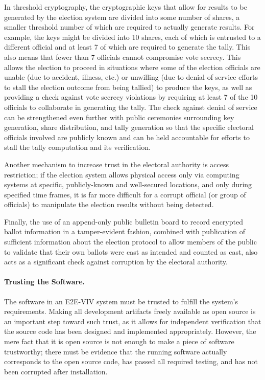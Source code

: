 In threshold cryptography, the cryptographic keys that allow for
results to be generated by the election system are divided into some
number of shares, a smaller threshold number of which are required to
actually generate results. For example, the keys might be divided into
10 shares, each of which is entrusted to a different official and at
least 7 of which are required to generate the tally. This also means
that fewer than 7 officials cannot compromise vote secrecy. This
allows the election to proceed in situations where some of the
election officials are unable (due to accident, illness, etc.) or
unwilling (due to denial of service efforts to stall the election
outcome from being tallied) to produce the keys, as well as providing
a check against vote secrecy violations by requiring at least 7 of the
10 officials to collaborate in generating the tally. The check against
denial of service can be strengthened even further with public
ceremonies surrounding key generation, share distribution, and tally
generation so that the specific electoral officials involved are
publicly known and can be held accountable for efforts to stall the
tally computation and its verification.

Another mechanism to increase trust in the electoral authority is
access restriction; if the election system allows physical access only
via computing systems at specific, publicly-known and well-secured
locations, and only during specified time frames, it is far more
difficult for a corrupt official (or group of officials) to manipulate
the election results without being detected.

Finally, the use of an append-only public bulletin board to record
encrypted ballot information in a tamper-evident fashion, combined
with publication of sufficient information about the election protocol
to allow members of the public to validate that their own ballots were
cast as intended and counted as cast, also acts as a significant check
against corruption by the electoral authority.

\paragraph{Trusting the Software.} The software in an E2E-VIV system
must be trusted to fulfill the system's requirements. Making all
development artifacts freely available as open source is an important
step toward such trust, as it allows for independent verification that
the source code has been designed and implemented
appropriately. However, the mere fact that it is open source is not
enough to make a piece of software trustworthy; there must be evidence
that the running software actually corresponds to the open source
code, has passed all required testing, and has not been corrupted
after installation.


